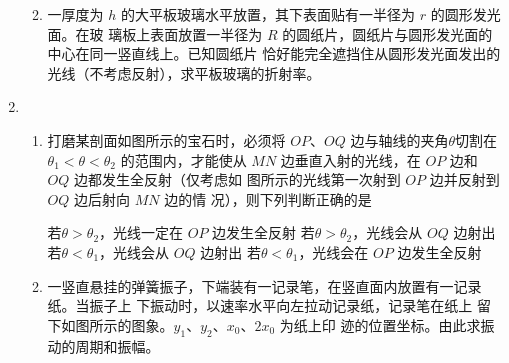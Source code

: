 \begin{enumerate}
\begin{enumerate}

\item 
一厚度为 $ h $ 的大平板玻璃水平放置，其下表面贴有一半径为 $ r $ 的圆形发光面。在玻
璃板上表面放置一半径为 $ R $ 的圆纸片，圆纸片与圆形发光面的中心在同一竖直线上。已知圆纸片
恰好能完全遮挡住从圆形发光面发出的光线（不考虑反射），求平板玻璃的折射率。



\end{enumerate}


\item 
{}
\begin{enumerate}
	\item
打磨某剖面如图所示的宝石时，必须将 $ OP $、$ OQ $ 边与轴线的夹角$ \theta $切割在
$ \theta _{1} < \theta < \theta _{2} $ 的范围内，才能使从 $ MN $ 边垂直入射的光线，在 $ OP $ 边和 $ OQ $ 边都发生全反射（仅考虑如
图所示的光线第一次射到 $ OP $ 边并反射到 $ OQ $ 边后射向 $ MN $ 边的情
况），则下列判断正确的是  
\begin{figure}[h!]
	\centering
	
\end{figure}

\fourchoices
{若$ \theta > \theta _{2} $，光线一定在 $ OP $ 边发生全反射}
{若$ \theta > \theta _{2} $，光线会从 $ OQ $ 边射出}
{若$ \theta < \theta _{1} $，光线会从 $ OQ $ 边射出}
{若$ \theta < \theta _{1} $，光线会在 $ OP $ 边发生全反射}



\item 
一竖直悬挂的弹簧振子，下端装有一记录笔，在竖直面内放置有一记录纸。当振子上
下振动时，以速率水平向左拉动记录纸，记录笔在纸上
留下如图所示的图象。$ y_{1} $、$ y_{2} $、$ x_{0} $、$ 2 x_{0} $ 为纸上印
迹的位置坐标。由此求振动的周期和振幅。
\begin{figure}[h!]
	\flushright
	
\end{figure}




\end{enumerate}



\end{enumerate}
